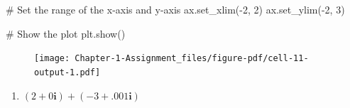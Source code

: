 \documentclass[
  letterpaper,
  DIV=11,
  numbers=noendperiod]{scrartcl}
\newenvironment{Shaded}{\begin{snugshade}}{\end{snugshade}}
\newcommand{\CommentTok}[1]{\textcolor[rgb]{0.37,0.37,0.37}{#1}}
\newcommand{\DecValTok}[1]{\textcolor[rgb]{0.68,0.00,0.00}{#1}}
\newcommand{\NormalTok}[1]{\textcolor[rgb]{0.00,0.23,0.31}{#1}}
\newcommand{\OperatorTok}[1]{\textcolor[rgb]{0.37,0.37,0.37}{#1}}
\providecommand{\tightlist}{%
  \setlength{\itemsep}{0pt}\setlength{\parskip}{0pt}}\usepackage{longtable,booktabs,array}
\begin{document}
\begin{Shaded}
\begin{Highlighting}[numbers=left,,]
\CommentTok{\# Set the range of the x{-}axis and y{-}axis}
\NormalTok{ax.set\_xlim(}\OperatorTok{{-}}\DecValTok{2}\NormalTok{, }\DecValTok{2}\NormalTok{)}
\NormalTok{ax.set\_ylim(}\OperatorTok{{-}}\DecValTok{2}\NormalTok{, }\DecValTok{3}\NormalTok{)}

\CommentTok{\# Show the plot}
\NormalTok{plt.show()}
\end{Highlighting}
\end{Shaded}

\begin{figure}[H]

{\centering \texttt{[image: Chapter-1-Assignment\_files/figure-pdf/cell-11-output-1.pdf]}

}

\end{figure}

\begin{enumerate}
\def\labelenumi{\alph{enumi}.}
\setcounter{enumi}{2}
\tightlist
\item
  \((2 + 0\mathbf i) + (-3 + .001\mathbf i)\)\\
\end{enumerate}
\end{document}
